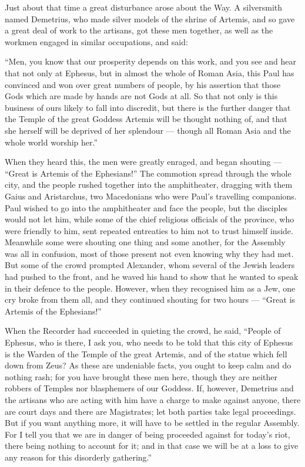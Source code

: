  Just about that time a great disturbance arose about the
Way.  A silversmith named Demetrius, who made silver models
of the shrine of Artemis, and so gave a great deal of work to the
artisans,  got these men together, as well as the workmen
engaged in similar occupations, and said:

``Men, you know that our prosperity depends on this work, 
and you see and hear that not only at Ephesus, but in almost the whole
of Roman Asia, this Paul has convinced and won over great numbers of
people, by his assertion that those Gods which are made by hands are not
Gods at all.  So that not only is this business of ours
likely to fall into discredit, but there is the further danger that the
Temple of the great Goddess Artemis will be thought nothing of, and that
she herself will be deprived of her splendour --- though all Roman Asia
and the whole world worship her.''

 When they heard this, the men were greatly enraged, and
began shouting --- ``Great is Artemis of the Ephesians!'' 
The commotion spread through the whole city, and the people rushed
together into the amphitheater, dragging with them Gaius and
Aristarchus, two Macedonians who were Paul's travelling companions.
 Paul wished to go into the amphitheater and face the
people, but the disciples would not let him,  while some of
the chief religious officials of the province, who were friendly to him,
sent repeated entreaties to him not to trust himself inside.
 Meanwhile some were shouting one thing and some another,
for the Assembly was all in confusion, most of those present not even
knowing why they had met.  But some of the crowd prompted
Alexander, whom several of the Jewish leaders had pushed to the front,
and he waved his hand to show that he wanted to speak in their defence
to the people.  However, when they recognised him as a Jew,
one cry broke from them all, and they continued shouting for two hours
--- ``Great is Artemis of the Ephesians!''

 When the Recorder had succeeded in quieting the crowd, he
said, ``People of Ephesus, who is there, I ask you, who needs to be told
that this city of Ephesus is the Warden of the Temple of the great
Artemis, and of the statue which fell down from Zeus?  As
these are undeniable facts, you ought to keep calm and do nothing rash;
 for you have brought these men here, though they are
neither robbers of Temples nor blasphemers of our Goddess. 
If, however, Demetrius and the artisans who are acting with him have a
charge to make against anyone, there are court days and there are
Magistrates; let both parties take legal proceedings.  But
if you want anything more, it will have to be settled in the regular
Assembly.  For I tell you that we are in danger of being
proceeded against for today's riot, there being nothing to account for
it; and in that case we will be at a loss to give any reason for this
disorderly gathering.''

